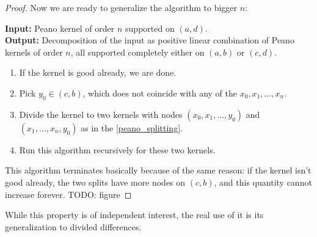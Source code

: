 \begin{proof}
	Now we are ready to generalize the algorithm to bigger $n$:

	\noindent \textbf{Input:} Peano kernel of order $n$ supported on $(a, d)$. \\
	\noindent \textbf{Output:} Decomposition of the input as positive linear combination of Peano kernels of order $n$, all supported completely either on $(a, b)$ or $(c, d)$.
	\begin{enumerate}
		\item If the kernel is good already, we are done.
		\item Pick $y_{0} \in (c, b)$, which does not coincide with any of the $x_{0}, x_{1}, \ldots, x_{n}$.
		\item Divide the kernel to two kernels with nodes $(x_{0}, x_{1}, \ldots, y_{0})$ and $(x_{1}, \ldots, x_{n}, y_{0})$ as in the \ref{peano_splitting}.
		\item Run this algorithm recursively for these two kernels.
	\end{enumerate}
	This algorithm terminates basically because of the same reason: if the kernel isn't good already, the two splits have more nodes on $(c, b)$, and this quantity cannot increase forever.
	TODO: figure
\end{proof}

While this property is of independent interest, the real use of it is its generalization to divided differences.

